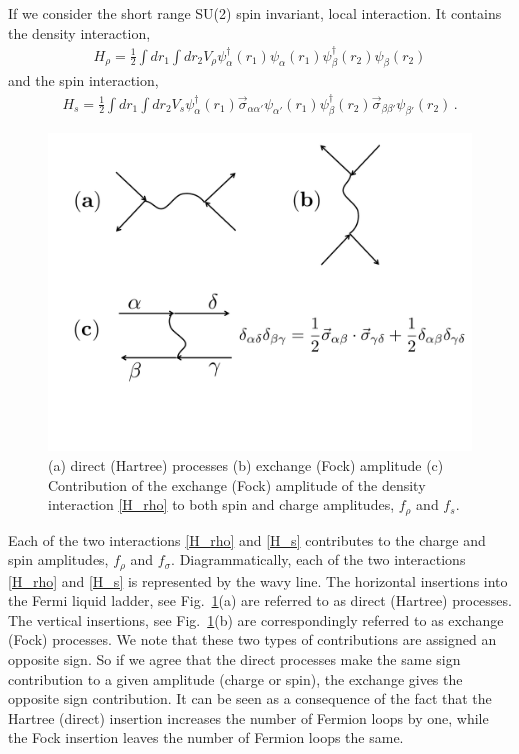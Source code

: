 If we consider the short range SU(2) spin invariant, local interaction. 
It contains the density interaction,
\begin{align}\label{H_rho}
H_{\rho} = \frac{1}{2} \int d r_1 \int d r_2  V_{\rho} \psi^{\dag}_{\alpha}(r_1)  \psi_{\alpha}(r_1) 
\psi^{\dag}_{\beta}(r_2) \psi_{\beta}(r_2) 
\end{align}
and the spin interaction,
\begin{align}\label{H_s}
H_{s} = \frac{1}{2} \int d r_1 \int d r_2  V_{s} \psi^{\dag}_{\alpha}(r_1) \vec{\sigma}_{\alpha\alpha'}  \psi_{\alpha'}(r_1) 
\psi^{\dag}_{\beta}(r_2) \vec{\sigma}_{\beta\beta'} \psi_{\beta'}(r_2) \, .
\end{align}
%
\begin{figure}[h]
\begin{center}
\includegraphics[width=0.5\columnwidth]{Fock_Ampl.pdf}
\caption{ (a) direct (Hartree) processes (b) exchange (Fock) amplitude 
(c) Contribution of the exchange (Fock) amplitude of the density interaction \eqref{H_rho} to both spin and charge amplitudes, $f_{\rho}$ and $f_s$.}
\label{Fock}
\end{center}
\end{figure}

Each of the two interactions \eqref{H_rho} and \eqref{H_s} contributes to the charge and spin amplitudes, $f_{\rho}$ and $f_{\sigma}$.
Diagrammatically, each of the two  interactions  \eqref{H_rho} and \eqref{H_s} is represented by the wavy line.
The horizontal insertions into the Fermi liquid ladder, see Fig.~\ref{Fock}(a) are referred to as direct (Hartree) processes.
The vertical insertions, see Fig.~\ref{Fock}(b) are correspondingly referred to as exchange (Fock) processes.
We note that these two types of contributions are assigned an opposite sign.
So if we agree that the direct processes make the same sign contribution to a given amplitude (charge or spin), the exchange gives the opposite sign contribution.
It can be seen as a consequence of the fact that the Hartree (direct) insertion increases the number of Fermion loops by one, while the Fock insertion leaves the number of Fermion loops the same.

